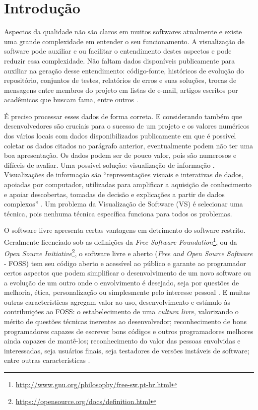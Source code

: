 \chapter{Introdução}


Aspectos da qualidade não são claros em muitos softwares atualmente e existe
uma grande complexidade em entender o seu funcionamento. A visualização de
software pode auxiliar e ou facilitar o entendimento destes aspectos e pode
reduzir essa complexidade. Não faltam dados disponíveis publicamente para
auxiliar na geração desse entendimento: código-fonte, históricos de evolução do
repositório, conjuntos de testes, relatórios de erros e suas soluções, trocas
de mensagens entre membros do projeto em listas de e-mail, artigos escritos por
acadêmicos que buscam fama, entre outros \cite{messias2012}
\cite{benkler2006wealth}.

É preciso processar esses dados de forma correta. E considerando também que
desenvolvedores são cruciais para o sucesso de um projeto e os valores
numéricos dos vários locais com dados disponibilizados publicamente em que é
possível coletar os dados citados no parágrafo anterior, eventualmente podem não ter
uma boa apresentação. Os dados podem ser de pouco valor, pois são numerosos e
difíceis de avaliar. Uma possível solução: visualização de informação
\cite{messias2012}. Visualizações de informação são ``representações visuais e
interativas de dados, apoiadas por computador, utilizadas para amplificar a
aquisição de conhecimento e apoiar descobertas, tomadas de decisão e
explicações a partir de dados complexos'' \cite{card1999readings}. Um problema
da Visualização de Software (VS) é selecionar uma técnica, pois nenhuma técnica
específica funciona para todos os problemas.


O software livre apresenta certas vantagens em detrimento do software restrito.
Geralmente licenciado sob as definições da
\textit{Free Software Foundation}\footnote{\url{http://www.gnu.org/philosophy/free-sw.pt-br.html}},
ou da \textit{Open Source Initiative}\footnote{\url{https://opensource.org/docs/definition.html}},
o software livre e aberto (\textit{Free and Open Source Software} - FOSS) tem
seu código aberto e acessível ao público e garante ao programador certos
aspectos que podem simplificar o desenvolvimento de um novo software ou a
evolução de um outro onde o envolvimento é desejado, seja por questões de
melhoria, ética, personalização ou simplesmente pelo interesse pessoal
\cite{meirelles2013monitoramento}. E muitas outras características agregam
valor ao uso, desenvolvimento e estímulo às contribuições ao FOSS: o
estabelecimento de uma \textit{cultura livre}, valorizando o mérito de questões
técnicas inerentes ao desenvolvedor; reconhecimento de bons programadores
capazes de escrever bons códigos e outros programadores melhores ainda capazes de
mantê-los; reconhecimento do valor das pessoas envolvidas e interessadas, seja
usuários finais, seja testadores de versões instáveis de software; entre outras
características \cite{raymond1999cathedral}.

